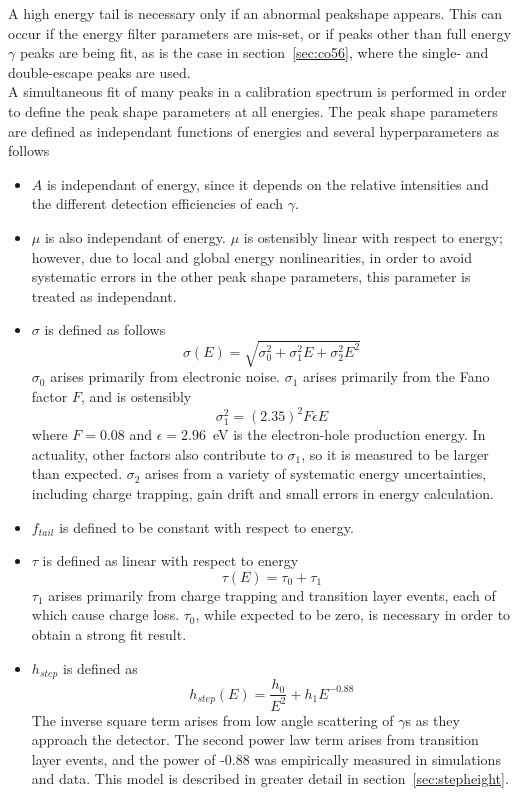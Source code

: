\documentclass[/main.tex]{subfiles}
\begin{document}
A high energy tail is necessary only if an abnormal peakshape appears.
This can occur if the energy filter parameters are mis-set, or if peaks other than full energy $\gamma$ peaks are being fit, as is the case in section~\ref{sec:co56}, where the single- and double-escape peaks are used.
\\
A simultaneous fit of many peaks in a calibration spectrum is performed in order to define the peak shape parameters at all energies.
The peak shape parameters are defined as independant functions of energies and several hyperparameters as follows
\begin{itemize}
\item $A$ is independant of energy, since it depends on the relative intensities and the different detection efficiencies of each $\gamma$.
\item $\mu$ is also independant of energy.
  $\mu$ is ostensibly linear with respect to energy; however, due to local and global energy nonlinearities, in order to avoid systematic errors in the other peak shape parameters, this parameter is treated as independant.
\item $\sigma$ is defined as follows
  \begin{equation}
    \sigma(E) = \sqrt{\sigma_0^2 + \sigma_1^2E + \sigma_2^2E^2}
  \end{equation}
  $\sigma_0$ arises primarily from electronic noise. $\sigma_1$ arises primarily from the Fano factor $F$, and is ostensibly
  \begin{equation}
    \sigma_1^2 = (2.35)^2F\epsilon E
  \end{equation}
  where $F=0.08$ and $\epsilon=2.96$~eV is the electron-hole production energy.
  In actuality, other factors also contribute to $\sigma_1$, so it is measured to be larger than expected.
  $\sigma_2$ arises from a variety of systematic energy uncertainties, including charge trapping, gain drift and small errors in energy calculation.
\item $f_{tail}$ is defined to be constant with respect to energy.
\item $\tau$ is defined as linear with respect to energy
  \begin{equation}
    \tau(E) = \tau_0 + \tau_1
  \end{equation}
  $\tau_1$ arises primarily from charge trapping and transition layer events, each of which cause charge loss.
  $\tau_0$, while expected to be zero, is necessary in order to obtain a strong fit result.
\item $h_{step}$ is defined as
  \begin{equation}
    h_{step}(E) = \frac{h_0}{E^2} + h_1E^{-0.88}
  \end{equation}
  The inverse square term arises from low angle scattering of $\gamma$s as they approach the detector.
  The second power law term arises from transition layer events, and the power of -0.88 was empirically measured in simulations and data.
  This model is described in greater detail in section~\ref{sec:stepheight}.
\end{itemize}
\end{document}
